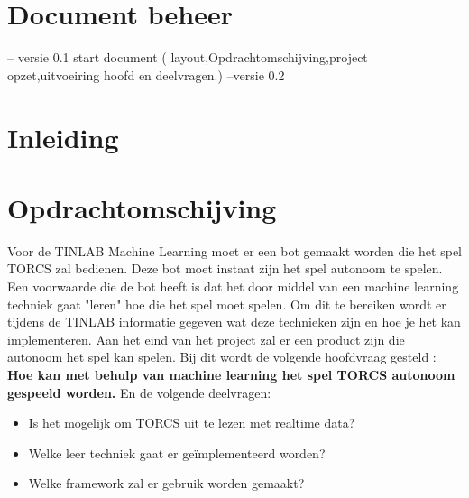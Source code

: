 \documentclass{article}
\begin{document}
\sffamily
{}
\newpage
\tableofcontents

\section{Document beheer}
-- versie 0.1 start document ( layout,Opdrachtomschijving,project opzet,uitvoeiring hoofd en deelvragen.)
--versie 0.2  

\newpage
\section{Inleiding}




\section{Opdrachtomschijving}
Voor de TINLAB Machine Learning moet er een bot gemaakt worden die het spel TORCS zal bedienen. Deze bot moet instaat zijn het spel autonoom te spelen. Een voorwaarde die de bot heeft is dat het door middel van een machine learning techniek gaat "leren" hoe die het spel moet spelen. Om dit te bereiken wordt er tijdens de TINLAB informatie gegeven wat deze technieken zijn en hoe je het kan implementeren. Aan het eind van het project zal er een product zijn die autonoom het spel kan spelen.  
\newline \newline
Bij dit wordt de volgende hoofdvraag gesteld : \newline 
\textbf{Hoe kan met behulp van machine learning het spel TORCS autonoom gespeeld worden.} \newline
En de volgende deelvragen:
\begin{itemize}
\item Is het mogelijk om TORCS uit te lezen met realtime data?
\item Welke leer techniek gaat er geïmplementeerd worden?
\item Welke framework zal er gebruik worden gemaakt?
\end{itemize}
\end{document}
